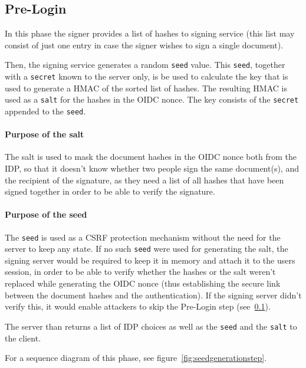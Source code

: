 \subsection{Pre-Login}\label{subsec:pre-login}
In this phase the signer provides a list of hashes to signing service
(this list may consist of just one entry in case the signer wishes to sign a single document).

Then, the signing service generates a random \texttt{seed} value.
This \texttt{seed}, together with a \texttt{secret} known to the server only,
is be used to calculate the key that is used to generate a \gls{HMAC} of the sorted list of hashes.
The resulting \gls{HMAC} is used as a \texttt{salt} for the hashes in the \gls{OIDC} nonce.
The key consists of the \texttt{secret} appended to the \texttt{seed}.

\paragraph{Purpose of the salt}
The salt is used to mask the document hashes in the \gls{OIDC} nonce both from the \gls{IDP},
so that it doesn't know whether two people sign the same document(s),
and the recipient of the signature, as they need a list of all hashes that have been signed together
in order to be able to verify the signature.

\paragraph{Purpose of the seed}
The \texttt{seed} is used as a \gls{CSRF} protection mechanism without the need for the server to keep any state.
If no such \texttt{seed} were used for generating the salt,
the signing server would be required to keep it in memory and attach it to the users session,
in order to be able to verify whether the hashes or the salt weren't replaced while generating the \gls{OIDC} nonce
(thus establishing the secure link between the document hashes and the authentication).
If the signing server didn't verify this, it would enable attackers to skip the Pre-Login step (see~\ref{subsec:pre-login}).

The server than returns a list of \gls{IDP} choices as well as the \texttt{seed} and the \texttt{salt} to the client.

For a sequence diagram of this phase, see figure~\ref{fig:seedgenerationstep}.

